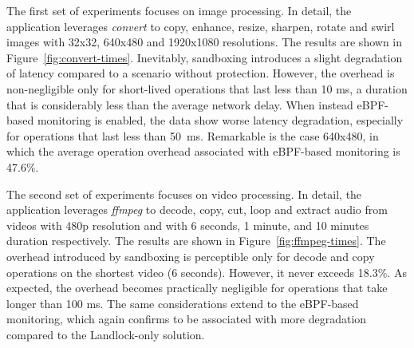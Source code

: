 The first set of experiments focuses on image processing. In detail,
the application leverages {\em convert} to copy, enhance, resize,
sharpen, rotate and swirl images with 32x32, 640x480 and 1920x1080
resolutions. The results are shown in
Figure~\ref{fig:convert-times}. Inevitably, sandboxing introduces a
slight degradation of latency compared to a scenario without
protection.  However, the overhead is non-negligible only for
short-lived operations that last less than 10 ms, a duration that is
considerably less than the average network delay. When instead
eBPF-based monitoring is enabled, the data show worse latency
degradation, especially for operations that last less than
50~ms. Remarkable is the case 640x480, in which the average operation
overhead associated with eBPF-based monitoring is 47.6\%.

The second set of experiments focuses on video processing. In detail,
the application leverages {\em ffmpeg} to decode, copy, cut, loop and
extract audio from videos with 480p resolution and with 6 seconds, 1
minute, and 10 minutes duration respectively. The results are shown in
Figure~\ref{fig:ffmpeg-times}. The overhead introduced by sandboxing
is perceptible only for decode and copy operations on the shortest
video (6 seconds). However, it never exceeds 18.3\%. As expected, the
overhead becomes practically negligible for operations that take
longer than 100 ms. The same considerations extend to the eBPF-based
monitoring, which again confirms to be associated with more
degradation compared to the Landlock-only solution.

